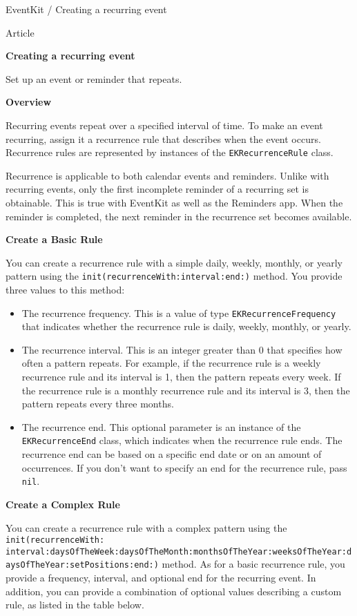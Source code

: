 \documentclass{article}
\title{}
\author{}
\date{}
\begin{document}
\usepackage{booktabs}

EventKit / Creating a recurring event

Article

\textbf{Creating a recurring event}

Set up an event or reminder that repeats.

\textbf{Overview}

Recurring events repeat over a specified interval of time. To make an event recurring, assign it a recurrence rule that describes when the event occurs. Recurrence rules are represented by instances of the \texttt{EKRecurrenceRule} class.

Recurrence is applicable to both calendar events and reminders. Unlike with recurring events, only the first incomplete reminder of a recurring set is obtainable. This is true with EventKit as well as the Reminders app. When the reminder is completed, the next reminder in the recurrence set becomes available.

\textbf{Create a Basic Rule}

You can create a recurrence rule with a simple daily, weekly, monthly, or yearly pattern using the \texttt{init(recurrenceWith:interval:end:)} method. You provide three values to this method:

\begin{itemize}
    \item The recurrence frequency. This is a value of type \texttt{EKRecurrenceFrequency} that indicates whether the recurrence rule is daily, weekly, monthly, or yearly.
    \item The recurrence interval. This is an integer greater than 0 that specifies how often a pattern repeats. For example, if the recurrence rule is a weekly recurrence rule and its interval is 1, then the pattern repeats every week. If the recurrence rule is a monthly recurrence rule and its interval is 3, then the pattern repeats every three months.
    \item The recurrence end. This optional parameter is an instance of the \texttt{EKRecurrenceEnd} class, which indicates when the recurrence rule ends. The recurrence end can be based on a specific end date or on an amount of occurrences. If you don't want to specify an end for the recurrence rule, pass \texttt{nil}.
\end{itemize}

\textbf{Create a Complex Rule}

You can create a recurrence rule with a complex pattern using the \texttt{init(recurrenceWith: interval:daysOfTheWeek:daysOfTheMonth:monthsOfTheYear:weeksOfTheYear:daysOfTheYear:setPositions:end:)} method. As for a basic recurrence rule, you provide a frequency, interval, and optional end for the recurring event. In addition, you can provide a combination of optional values describing a custom rule, as listed in the table below.
\end{document}
